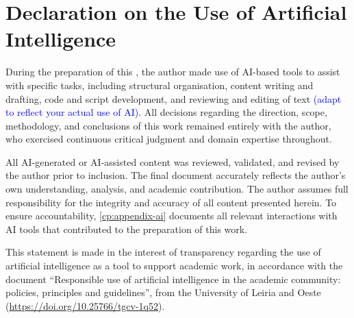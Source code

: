 {{    }{%
        \chapter*{Declaration on the Use of Artificial Intelligence}


        \vspace{2em}

        During the preparation of this \GetThesisType, the author made use of AI-based tools to assist with specific tasks, including \textcolor{blue}{\lbrack} structural organisation, content writing and drafting, code and script development, and reviewing and editing of text \textcolor{blue}{\rbrack (adapt to reflect your actual use of AI)}. All decisions regarding the direction, scope, methodology, and conclusions of this work remained entirely with the author, who exercised continuous critical judgment and domain expertise throughout.

        All AI-generated or AI-assisted content was reviewed, validated, and revised by the author prior to inclusion. The final document accurately reflects the author's own understanding, analysis, and academic contribution. The author assumes full responsibility for the integrity and accuracy of all content presented herein. To ensure accountability, \autoref{cp:appendix-ai} documents all relevant interactions with AI tools that contributed to the preparation of this work.

        This statement is made in the interest of transparency regarding the use of artificial intelligence as a tool to support academic work, in accordance with the document ``Responsible use of artificial intelligence in the academic community: policies, principles and guidelines'', from the University of Leiria and Oeste (\url{https://doi.org/10.25766/tgcv-1q52}).
    }

    \MediaOptionLogicBlank
}{}

